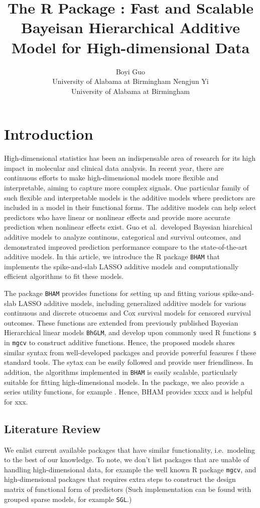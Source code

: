 \documentclass[
]{jss}
\author{
Boyi Guo\\University of Alabama at Birmingham \And Nengjun
Yi\\University of Alabama at Birmingham
}
\title{The R Package \pkg{BHAM}: Fast and Scalable Bayeisan Hierarchical
Additive Model for High-dimensional Data}
\begin{document}
\section{Introduction}

High-dimensional statistics has been an indispensable area of research
for its high impact in molecular and clinical data analysis. In recent
year, there are continuous efforts to make high-dimensional models more
flexible and interpretable, aiming to capture more complex signals. One
particular family of such flexible and interpretable models is the
additive models where predictors are included in a model in their
functional forms. The additive models can help select predictors who
have linear or nonlinear effects and provide more accurate prediction
when nonlinear effects exist. Guo et al.~developed Bayesian hiarchical
additive models to analyze continous, categorical and survival outcomes,
and demonstrated improved prediction performance compare to the
state-of-the-art additive models. In this article, we introduce the R
package \texttt{BHAM} that implements the spike-and-slab LASSO additive
models and computationally efficient algorithms to fit these models.

The package \texttt{BHAM} provides functions for setting up and fitting
various spike-and-slab LASSO additive models, including generalized
additive models for various continuous and discrete otucoems and Cox
survival models for censored survival outcomes. These functions are
extended from previously published Bayesian Hierarchical linear models
\texttt{BhGLM}, and develop upon commonly used R functions \texttt{s} in
\texttt{mgcv} to construct additive functions. Hence, the proposed
models shares similar syntax from well-developed packages and provide
powerful feasures f these standard tools. The sytax can be easily
followed and provide user friendliness. In addition, the algorithms
implemented in \texttt{BHAM} is easily scalable, particularly suitable
for fitting high-dimensional models. In the package, we also provide a
series utility functions, for example . Hence, BHAM provides xxxx and is
helpful for xxx.

\subsection{Literature Review}

We enlist current available packages that have similar functionality,
i.e.~modeling to the best of our knowledge. To note, we don't list
packages that are unable of handling high-dimensional data, for example
the well known R package \texttt{mgcv}, and high-dimensional packages
that requires extra steps to construct the design matrix of functional
form of predictors (Such implementation can be found with grouped sparse
models, for example \texttt{SGL}.)
\end{document}
